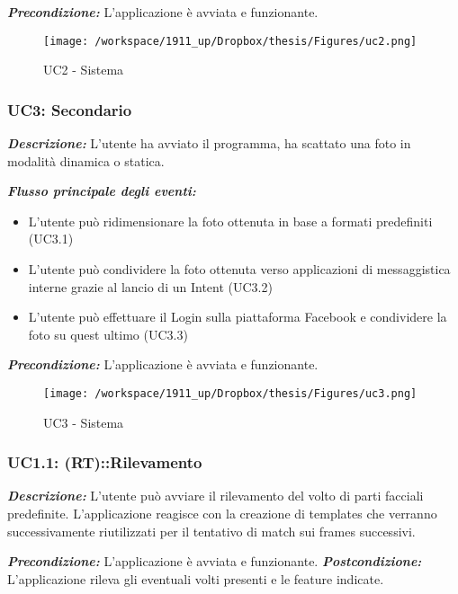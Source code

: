 \textbf{\textit{Precondizione:}} L'applicazione è avviata e funzionante.

\begin{figure}[H]\centering  
\texttt{[image: /workspace/1911\_up/Dropbox/thesis/Figures/uc2.png]}
\caption[UC2 - Sistema]{UC2 - Sistema}
\label{pic-a}
\end{figure}


\subsubsection{UC3: Secondario}

\textbf{\textit{Descrizione:}} L'utente ha avviato il programma, ha scattato una foto in modalità dinamica o statica.

\textbf{\textit{Flusso principale degli eventi:}} 

\begin{itemize}
\item L'utente può ridimensionare la foto ottenuta in base a formati predefiniti (UC3.1)
\item L'utente può condividere la foto ottenuta verso applicazioni di messaggistica interne grazie al lancio di un Intent (UC3.2)
\item L'utente può effettuare il Login sulla piattaforma Facebook e condividere la foto su quest ultimo (UC3.3)
\end{itemize}

\textbf{\textit{Precondizione:}} L'applicazione è avviata e funzionante.

\begin{figure}[H]\centering  
\texttt{[image: /workspace/1911\_up/Dropbox/thesis/Figures/uc3.png]}
\caption[UC3 - Sistema]{UC3 - Sistema}
\label{pic-a}
\end{figure}


\subsubsection{UC1.1: (RT)::Rilevamento}

\textbf{\textit{Descrizione:}} L'utente può avviare il rilevamento del volto di parti facciali predefinite. L'applicazione reagisce con la creazione di templates che verranno successivamente riutilizzati per il tentativo di match sui frames successivi.


\textbf{\textit{Precondizione:}} L'applicazione è avviata e funzionante.
\textbf{\textit{Postcondizione:}} L'applicazione rileva gli eventuali volti presenti e le feature indicate.



